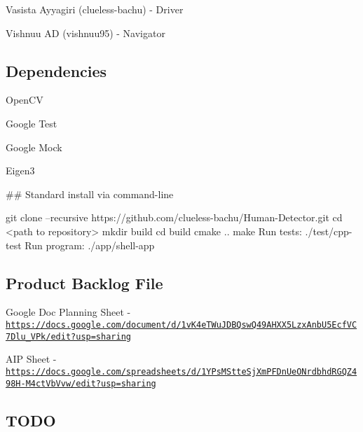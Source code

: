 \begin{DoxyItemize}
\item Vasista Ayyagiri (clueless-\/bachu) -\/ Driver
\item Vishnuu AD (vishnuu95) -\/ Navigator
\end{DoxyItemize}

\subsection*{Dependencies}


\begin{DoxyItemize}
\item Open\+CV
\item Google Test
\item Google Mock
\item Eigen3
\end{DoxyItemize}

\#\# Standard install via command-\/line 
\begin{DoxyCode}
git clone --recursive https://github.com/clueless-bachu/Human-Detector.git
cd <path to repository>
mkdir build
cd build
cmake ..
make
Run tests: ./test/cpp-test
Run program: ./app/shell-app
\end{DoxyCode}


\subsection*{Product Backlog File}

Google Doc Planning Sheet -\/ \href{https://docs.google.com/document/d/1vK4eTWuJDBQswQ49AHXX5LzxAnbU5EcfVC7Dlu_3VPk/edit?usp=sharing}{\tt https\+://docs.\+google.\+com/document/d/1v\+K4e\+T\+Wu\+J\+D\+B\+Qsw\+Q49\+A\+H\+X\+X5\+Lzx\+Anb\+U5\+Ecf\+V\+C7\+Dlu\+\_\+V\+Pk/edit?usp=sharing}

A\+IP Sheet -\/ \href{https://docs.google.com/spreadsheets/d/1YPsMStteSjXmPFDnUeONrdbhdRGQZ498H-M4ctVbVvw/edit?usp=sharing}{\tt https\+://docs.\+google.\+com/spreadsheets/d/1\+Y\+Ps\+M\+Stte\+Sj\+Xm\+P\+F\+Dn\+Ue\+O\+Nrdbhd\+R\+G\+Q\+Z498\+H-\/\+M4ct\+Vb\+Vvw/edit?usp=sharing}

\subsection*{T\+O\+DO}


